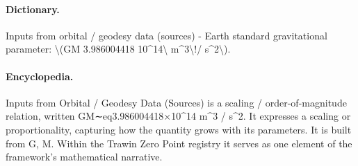 \paragraph{Dictionary.}
Inputs from orbital / geodesy data (sources) - Earth standard gravitational parameter: \textbackslash{}(GM 3.986004418 10\textasciicircum{}14\textbackslash{} m\textasciicircum{}3\textbackslash{}!/ s\textasciicircum{}2\textbackslash{}).

\paragraph{Encyclopedia.}
Inputs from Orbital / Geodesy Data (Sources) is a scaling / order-of-magnitude relation, written GM∼eq3.986004418×10\textasciicircum{}14 m\textasciicircum{}3 / s\textasciicircum{}2. It expresses a scaling or proportionality, capturing how the quantity grows with its parameters. It is built from G, M. Within the Trawin Zero Point registry it serves as one element of the framework's mathematical narrative.
